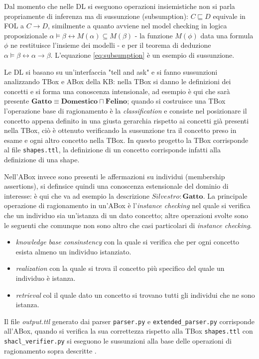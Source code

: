 \documentclass{article}
\begin{document}
Dal momento che nelle DL si eseguono operazioni insiemistiche non si parla propriamente di inferenza ma di sussunzione (subsumption): $C \sqsubseteq D$ equivale in FOL a $C \rightarrow D$, similmente a quanto avviene nel model checking in logica proposizionale $\alpha \models \beta \longleftrightarrow M(\alpha) \subseteq M(\beta)$ - la funzione $M(\phi)$ data una formula $\phi$ ne restituisce l'insieme dei modelli - e per il teorema di deduzione $\alpha \models \beta  \longleftrightarrow \alpha \rightarrow \beta$. L'equazione \ref{eq:subsumption} è un esempio di sussunzione.

Le DL si basano su un'interfaccia "tell and ask" e si fanno sussunzioni analizzando TBox e ABox della KB: nella TBox si danno le definizioni dei concetti e si forma una conoscenza intensionale, ad esempio è qui che sarà presente $ \textbf{Gatto} \equiv \textbf{Domestico} \sqcap \textbf{Felino} $; quando si costruisce una TBox l'operazione base di ragionamento è la \textit{classification} e consiste nel posizionare il concetto appena definito in una giusta gerarchia rispetto ai concetti già presenti nella TBox, ciò è ottenuto verificando la sussunzione tra il concetto preso in esame e ogni altro concetto nella TBox. In questo progetto la TBox corrisponde al file \texttt{shapes.ttl}, la definizione di un concetto corrisponde infatti alla definizione di una shape.

Nell'ABox invece sono presenti le affermazioni su individui (membership assertions), si definsice quindi una conoscenza estensionale del dominio di interesse: è qui che va ad esempio la descrizione $ Silvestro:\textbf{Gatto} $. La principale operazione di ragionamento in un'ABox è l'\textit{instance checking} nel quale si verifica che un individuo sia un'istanza di un dato concetto; altre operazioni svolte sono le seguenti che comunque non sono altro che casi particolari di \textit{instance checking}. 
\begin{itemize}
    \item \textit{knowledge base consinstency} con la quale si verifica che per ogni concetto esista almeno un individuo istanziato. 
    \item \textit{realization} con la quale si trova il concetto più specifico del quale un individuo è istanza. 
    \item \textit{retrieval} col il quale dato un concetto si trovano tutti gli individui che ne sono istanza.
\end{itemize}
Il file \textit{output.ttl} generato dai parser \texttt{parser.py} e \texttt{extended\_parser.py} corrisponde all'ABox, quando si verifica la sua correttezza rispetto alla TBox \texttt{shapes.ttl} con \texttt{shacl\_verifier.py} si eseguono le sussunzioni alla base delle operazioni di ragionamento sopra descritte .
\end{document}

